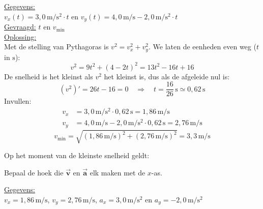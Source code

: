 \documentclass{ximera}
\begin{document}
\begin{exercise}
\begin{question}
        \begin{solution}\nl
            \underline{Gegevens:}\\
            $v_x(t) = 3{,}0 \, \mathrm{m/s^2} \cdot t$ en $v_y(t) = 4{,}0 \, \mathrm{m/s} - 2{,}0 \, \mathrm{m/s^2} \cdot t$\\

            \underline{Gevraagd:} $t$ en $v_{\min}$\\

            \underline{Oplossing:}\\
            Met de stelling van Pythagoras is $v^{2} = v_x^{2} + v_y^{2}$. We laten de eenheden even weg ($t$ in $\mathrm{s}$):
            \[
                v^{2} = 9t^{2} + (4 - 2t)^{2} = 13t^{2} - 16t + 16
            \]
            De snelheid is het kleinst als $v^{2}$ het kleinst is, dus als de afgeleide nul is:
            \[
                (v^{2})' = 26t - 16 = 0 \quad \Rightarrow \quad t = \frac{16}{26} \, \mathrm{s} \simeq \boxed{0{,}62 \, \mathrm{s}}
            \]
            Invullen:
            \begin{align*}
                v_x &= 3{,}0 \, \mathrm{m/s^2} \cdot 0{,}62 \, \mathrm{s} = 1{,}86 \, \mathrm{m/s}\\
                v_y &= 4{,}0 \, \mathrm{m/s} - 2{,}0 \, \mathrm{m/s^2} \cdot 0{,}62 \, \mathrm{s} = 2{,}76 \, \mathrm{m/s}
            \end{align*}
            \[
                v_{\min} = \sqrt{(1{,}86 \, \mathrm{m/s})^{2} + (2{,}76 \, \mathrm{m/s})^{2}} = \boxed{3{,}3 \, \mathrm{m/s}}
            \]
        \end{solution}
    \end{question}

    \begin{question}
        Op het moment van de kleinste snelheid geldt: 

        \begin{hint}
            Bepaal de hoek die $\vec{\mathbf{v}}$ en $\vec{\mathbf{a}}$ elk maken met de $x$-as.
        \end{hint}

        \begin{solution}\nl
            \underline{Gegevens:}\\
            $v_x = 1{,}86 \, \mathrm{m/s}$, $v_y = 2{,}76 \, \mathrm{m/s}$, $a_x = 3{,}0 \, \mathrm{m/s^2}$ en $a_y = -2{,}0 \, \mathrm{m/s^2}$\\


\end{solution}
\end{question}
\end{exercise}
\end{document}
